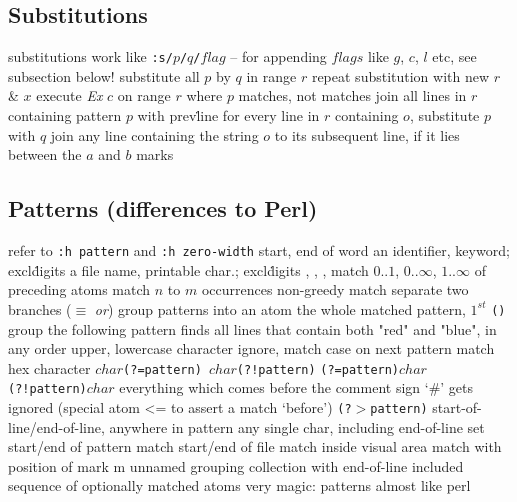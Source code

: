 \subsection{Substitutions}	{substitutions work like {\tt:s/$p$/$q$/$flag$} --
for appending $flags$ like $g$, $c$, $l$ etc, see subsection below!}
	{substitute all $p$ by $q$ in range $r$}
	{repeat substitution with new $r$ \& $x$}
	{execute {\it Ex\/} $c$ on range $r$ where $p$ mat\-ches, not matches}
	{join all lines in $r$ containing pattern $p$ with prev\. line}
	{for every line in $r$ containing $o$, substitute $p$ with $q$}
	{join any line containing the string $o$ to its subsequent line, if it lies between the $a$ and $b$ marks}

\subsection{Patterns (differences to Perl)}	{refer to {\tt :h pattern} and {\tt :h zero-width} }
\cmdOper{\bs$<$ \bs$>$ }	{start, end of word}
	{an identifier, keyword; excl\. digits}
	{a file name, printable char.; excl\. digits}
	{, , \key{\enter}, \key{$\gets$}}
\cmdOper{\bs = * \bs + }	{match $0..1$, $0..\infty$, $1..\infty$ of preceding atoms}
	{match $n$ to $m$ occurrences}
\cmdOper{\bs$\{-\}$ }	{non-greedy match}
\cmdOper{\bs$|$ }	{separate two branches ($\equiv$ {\it or\/})}
\cmdOper{\bs( \bs) }	{group patterns into an atom}
	{the whole matched pattern, $1^{st}$ {\tt()} group}
	{the following pattern finds all lines that contain both "red" and "blue", in any order}
	{upper, lowercase character}
	{ignore, match case on next pattern}
	{match hex character}
	{\tt $char$(?=pattern) $char$(?!pattern)\rm}
	{\tt (?=pattern)$char$ (?!pattern)$char$\rm}
	{ everything which comes before the
comment sign `#' gets ignored (special atom \bs@<= to assert a match `before')}
	{\tt (?$>$pattern)\rm }
\cmdOper{\bs\_\^{} \bs\_\$ }	{start-of-line/end-of-line, anywhere in pattern}
	{any single char, including end-of-line}
	{set start/end of pattern}
\cmdOper{\bs \%\^{} \bs\%\$ }	{match start/end of file}
	{match inside visual area}
	{match with position of mark m}
\cmdOper{\bs\%(\bs) }	{unnamed grouping}
\cmdOper{\bs\_$[$ $]$ }	{collection with end-of-line included}
\cmdOper{\bs\%$[$ $]$ }	{sequence of optionally matched atoms}
	{very magic: patterns almost like perl}

